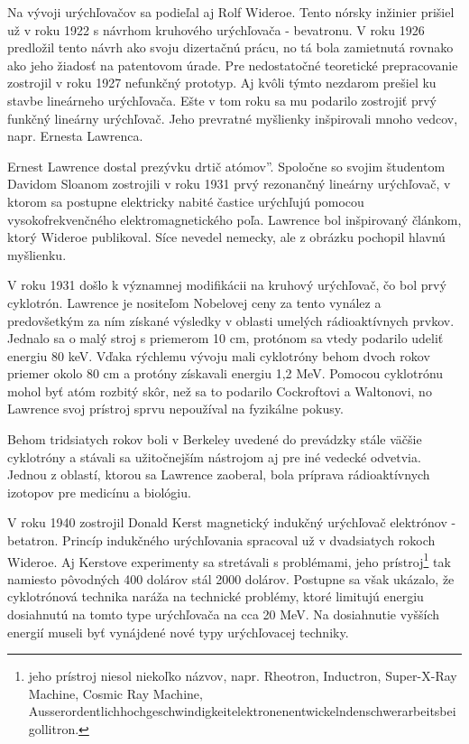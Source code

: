 \documentclass[../../main.tex]{subfiles}
\begin{document}
Na vývoji urýchľovačov sa podieľal aj Rolf Wideroe. Tento nórsky inžinier prišiel už v roku 1922 s návrhom kruhového urýchľovača - bevatronu. V roku 1926 predložil tento návrh ako svoju dizertačnú prácu, no tá bola zamietnutá rovnako ako jeho žiadosť na patentovom úrade. Pre nedostatočné teoretické prepracovanie zostrojil v roku 1927 nefunkčný prototyp. Aj kvôli týmto nezdarom prešiel ku stavbe lineárneho urýchľovača. Ešte v tom roku sa mu podarilo zostrojiť prvý funkčný lineárny urýchľovač. Jeho prevratné myšlienky inšpirovali mnoho vedcov, napr. Ernesta Lawrenca.

Ernest Lawrence dostal prezývku \quotedblbase drtič atómov\textquotedblright . Spoločne so svojim študentom Davidom Sloanom zostrojili v roku 1931 prvý rezonančný lineárny urýchľovač, v ktorom sa postupne elektricky nabité častice urýchľujú pomocou vysokofrekvenčného elektromagnetického poľa. Lawrence bol inšpirovaný článkom, ktorý Wideroe publikoval. Síce nevedel nemecky, ale z obrázku pochopil hlavnú myšlienku. 

V roku 1931 došlo k významnej modifikácii na kruhový urýchľovač, čo bol prvý cyklotrón. Lawrence je nositeľom Nobelovej ceny za tento vynález a predovšetkým za ním získané výsledky v oblasti umelých rádioaktívnych prvkov. Jednalo sa o malý stroj s priemerom 10 cm, protónom sa vtedy podarilo udeliť energiu 80 keV. Vďaka rýchlemu vývoju mali cyklotróny behom dvoch rokov priemer okolo 80 cm a protóny získavali energiu 1,2 MeV. Pomocou cyklotrónu mohol byť atóm rozbitý skôr, než sa to podarilo Cockroftovi a Waltonovi, no Lawrence svoj prístroj sprvu nepoužíval na fyzikálne pokusy.

Behom tridsiatych rokov boli v Berkeley uvedené do prevádzky stále väčšie cyklotróny a stávali sa užitočnejším nástrojom aj pre iné vedecké odvetvia. Jednou z oblastí, ktorou sa Lawrence zaoberal, bola príprava rádioaktívnych izotopov pre medicínu a biológiu.

V roku 1940 zostrojil Donald Kerst magnetický indukčný urýchľovač elektrónov - betatron. Princíp indukčného urýchľovania spracoval už v dvadsiatych rokoch Wideroe. Aj Kerstove experimenty sa stretávali s problémami, jeho prístroj\footnote{jeho prístroj niesol niekoľko názvov, napr. Rheotron, Inductron, Super-X-Ray Machine, Cosmic Ray Machine, Ausserordentlichhochgeschwindigkeitelektronenentwickelndenschwerarbeitsbeigollitron.} tak namiesto pôvodných 400 dolárov stál 2000 dolárov. Postupne sa však ukázalo, že cyklotrónová technika naráža na technické problémy, ktoré limitujú energiu dosiahnutú na tomto type urýchľovača na cca 20 MeV. Na dosiahnutie vyšších energií museli byť vynájdené nové typy urýchľovacej techniky.
\end{document}
